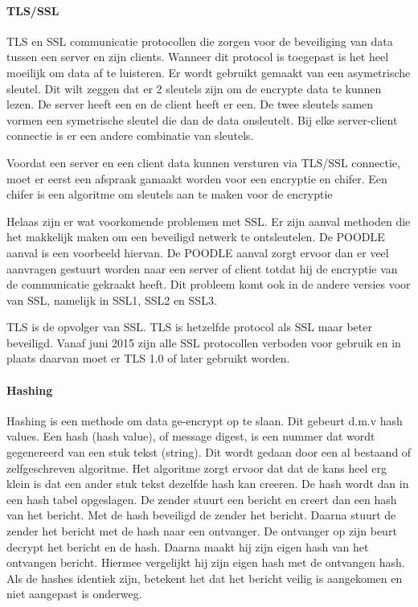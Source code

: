 \documentclass{article}
\begin{document}
\paragraph{TLS/SSL}
TLS en SSL communicatie protocollen die zorgen voor de beveiliging
van data tussen een server en zijn clients.
Wanneer dit protocol is toegepast is het heel moeilijk om
data af te luisteren.
Er wordt gebruikt gemaakt van een asymetrische sleutel.
Dit wilt zeggen dat er 2 sleutels zijn om de encrypte data te kunnen lezen.
De server heeft een en de client heeft er een.
De twee sleutels samen vormen een symetrische sleutel die dan de data onsleutelt.
Bij elke server-client connectie is er een andere combinatie van sleutels.

Voordat een server en een client data kunnen versturen via TLS/SSL connectie,
moet er eerst een afspraak gamaakt worden voor een encryptie en chifer.
Een chifer is een algoritme om sleutels aan te maken voor de encryptie

Helaas zijn er wat voorkomende problemen met SSL.
Er zijn aanval methoden die het makkelijk maken om een beveiligd
netwerk te ontsleutelen.
De POODLE aanval is een voorbeeld hiervan.
De POODLE aanval zorgt ervoor dan er veel aanvragen gestuurt worden
naar een server of client totdat hij de encryptie van de communicatie
gekraakt heeft.
Dit probleem komt ook in de andere versies voor van SSL, namelijk in
SSL1, SSL2 en SSL3.

TLS is de opvolger van SSL.
TLS is hetzelfde protocol als SSL maar beter beveiligd.
Vanaf juni 2015 zijn alle SSL protocollen verboden voor gebruik en
in plaats daarvan moet er TLS 1.0 of later gebruikt worden.

\paragraph{Hashing}
Hashing is een methode om data ge-encrypt op te slaan.
Dit gebeurt d.m.v hash values.
Een hash (hash value), of message digest,
is een nummer dat wordt gegenereerd van een stuk tekst (string).
Dit wordt gedaan door een al bestaand of zelfgeschreven algoritme.
Het algoritme zorgt ervoor dat dat de kans heel erg klein is dat
een ander stuk tekst dezelfde hash kan creeren.
De hash wordt dan in een hash tabel opgeslagen.
De zender stuurt een bericht en creert dan een hash van het bericht.
Met de hash beveiligd de zender het bericht.
Daarna stuurt de zender het bericht met de hash naar een ontvanger.
De ontvanger op zijn beurt decrypt het bericht en de hash.
Daarna maakt hij zijn eigen hash van het ontvangen bericht.
Hiermee vergelijkt hij zijn eigen hash met de ontvangen hash.
Als de hashes identiek zijn, betekent het dat het bericht veilig is aangekomen
en niet aangepast is onderweg.
\end{document}
